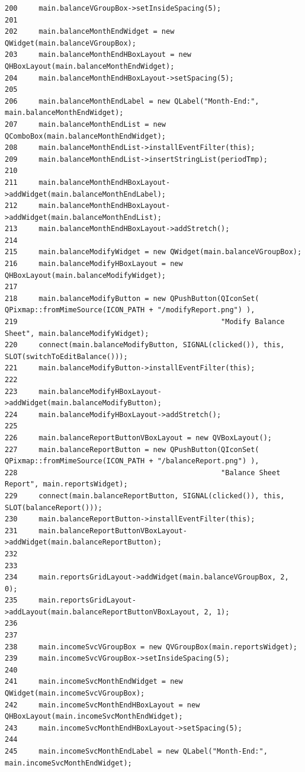 \begin{verbatim}
200     main.balanceVGroupBox->setInsideSpacing(5);
201     
202     main.balanceMonthEndWidget = new QWidget(main.balanceVGroupBox);
203     main.balanceMonthEndHBoxLayout = new QHBoxLayout(main.balanceMonthEndWidget);
204     main.balanceMonthEndHBoxLayout->setSpacing(5);
205     
206     main.balanceMonthEndLabel = new QLabel("Month-End:", main.balanceMonthEndWidget);
207     main.balanceMonthEndList = new QComboBox(main.balanceMonthEndWidget);
208     main.balanceMonthEndList->installEventFilter(this);
209     main.balanceMonthEndList->insertStringList(periodTmp);
210     
211     main.balanceMonthEndHBoxLayout->addWidget(main.balanceMonthEndLabel);
212     main.balanceMonthEndHBoxLayout->addWidget(main.balanceMonthEndList);
213     main.balanceMonthEndHBoxLayout->addStretch();
214     
215     main.balanceModifyWidget = new QWidget(main.balanceVGroupBox);
216     main.balanceModifyHBoxLayout = new QHBoxLayout(main.balanceModifyWidget);
217     
218     main.balanceModifyButton = new QPushButton(QIconSet( QPixmap::fromMimeSource(ICON_PATH + "/modifyReport.png") ),
219                                                "Modify Balance Sheet", main.balanceModifyWidget);
220     connect(main.balanceModifyButton, SIGNAL(clicked()), this, SLOT(switchToEditBalance()));
221     main.balanceModifyButton->installEventFilter(this);
222     
223     main.balanceModifyHBoxLayout->addWidget(main.balanceModifyButton);
224     main.balanceModifyHBoxLayout->addStretch();
225     
226     main.balanceReportButtonVBoxLayout = new QVBoxLayout();
227     main.balanceReportButton = new QPushButton(QIconSet( QPixmap::fromMimeSource(ICON_PATH + "/balanceReport.png") ),
228                                                "Balance Sheet Report", main.reportsWidget);
229     connect(main.balanceReportButton, SIGNAL(clicked()), this, SLOT(balanceReport()));
230     main.balanceReportButton->installEventFilter(this);
231     main.balanceReportButtonVBoxLayout->addWidget(main.balanceReportButton);
232         
233     
234     main.reportsGridLayout->addWidget(main.balanceVGroupBox, 2, 0);
235     main.reportsGridLayout->addLayout(main.balanceReportButtonVBoxLayout, 2, 1);
236     
237     
238     main.incomeSvcVGroupBox = new QVGroupBox(main.reportsWidget);
239     main.incomeSvcVGroupBox->setInsideSpacing(5);
240     
241     main.incomeSvcMonthEndWidget = new QWidget(main.incomeSvcVGroupBox);
242     main.incomeSvcMonthEndHBoxLayout = new QHBoxLayout(main.incomeSvcMonthEndWidget);
243     main.incomeSvcMonthEndHBoxLayout->setSpacing(5);
244     
245     main.incomeSvcMonthEndLabel = new QLabel("Month-End:", main.incomeSvcMonthEndWidget);

\end{verbatim}
